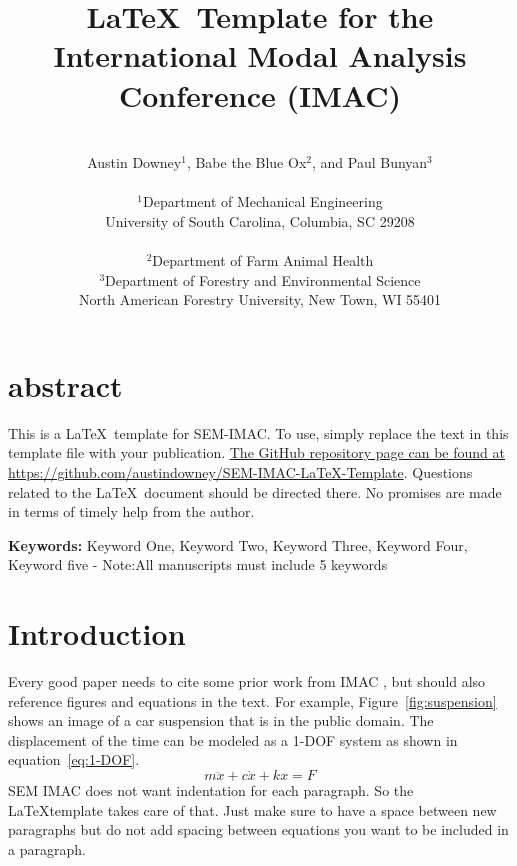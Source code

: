 \documentclass[10pt,letterpaper]{article}
\newcommand{\keywords}[1]{\vspace{2ex} \noindent \textbf{Keywords:} #1}
\begin{document}
	\date{} %
	
	\title{\LaTeX\  Template for the International Modal Analysis Conference (IMAC)}
	
	\author{\vspace{.25in}\\
	Austin Downey$^1$, Babe the Blue Ox$^2$, and Paul Bunyan$^3$\\ \\ %
	 $^1$Department of Mechanical Engineering \\
		University of South Carolina, Columbia, SC 29208 \\ \\ %
	 $^2$Department of Farm Animal Health \\
	 $^3$Department of Forestry and Environmental Science \\
		North American Forestry University, New Town, WI 55401 \\
	}
	\maketitle
	
	\section{abstract}
		This is a \LaTeX\ template for SEM-IMAC. To use, simply replace the text in this template file with your publication. \href{https://github.com/austindowney/SEM-IMAC-LaTeX-Template}{The GitHub repository page can be found at https://github.com/austindowney/SEM-IMAC-LaTeX-Template}. Questions related to the \LaTeX\ document should be directed there. No promises are made in terms of timely help from the author.
	
	\keywords{Keyword One, Keyword Two, Keyword Three, Keyword Four, Keyword five - Note:All manuscripts must include 5 keywords}
	
	\section{Introduction}
	
		Every good paper needs to cite some prior work from IMAC \cite{Downey2024VibrationMechanicsPractical,Dodson2021HighRateStructural,Downey2020Millisecondmodelupdating,Downey2016HighCapacityVariable}, but should also reference figures and equations in the text. For example, Figure~\ref{fig:suspension} shows an image of a car suspension that is in the public domain. The displacement of the time can be modeled as a 1-DOF system as shown in equation~\ref{eq:1-DOF}.
		\begin{equation}
		m\ddot{x} + c\dot{x} + kx = F
		\label{eq:1-DOF}
		\end{equation}
		SEM IMAC does not want indentation for each paragraph. So the \LaTeX template takes care of that. Just make sure to have a space between new paragraphs but do not add spacing between equations you want to be included in a paragraph. 
		
\end{document}
